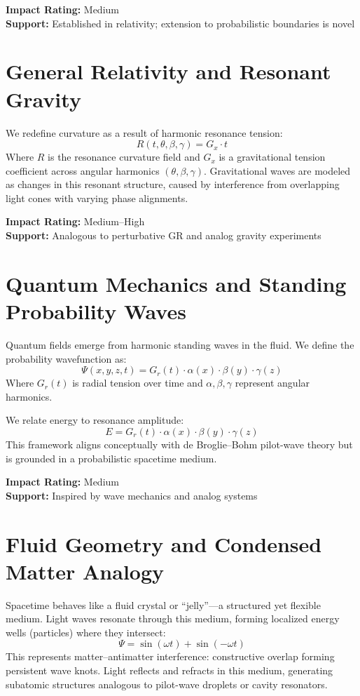 \documentclass[12pt]{article}
\begin{document}
\textbf{Impact Rating:} Medium\\
\textbf{Support:} Established in relativity; extension to probabilistic boundaries is novel

\section{General Relativity and Resonant Gravity}
We redefine curvature as a result of harmonic resonance tension:
\begin{equation}
 R(t,\theta,\beta,\gamma) = G_x \cdot t
\end{equation}
Where $R$ is the resonance curvature field and $G_x$ is a gravitational tension coefficient across angular harmonics $(\theta,\beta,\gamma)$. Gravitational waves are modeled as changes in this resonant structure, caused by interference from overlapping light cones with varying phase alignments.

\textbf{Impact Rating:} Medium--High\\
\textbf{Support:} Analogous to perturbative GR and analog gravity experiments

\section{Quantum Mechanics and Standing Probability Waves}
Quantum fields emerge from harmonic standing waves in the fluid. We define the probability wavefunction as:
\begin{equation}
 \Psi(x, y, z, t) = G_r(t) \cdot \alpha(x) \cdot \beta(y) \cdot \gamma(z)
\end{equation}
Where $G_r(t)$ is radial tension over time and $\alpha, \beta, \gamma$ represent angular harmonics.

We relate energy to resonance amplitude:
\begin{equation}
 E = G_r(t) \cdot \alpha(x) \cdot \beta(y) \cdot \gamma(z)
\end{equation}
This framework aligns conceptually with de Broglie--Bohm pilot-wave theory but is grounded in a probabilistic spacetime medium.

\textbf{Impact Rating:} Medium\\
\textbf{Support:} Inspired by wave mechanics and analog systems

\section{Fluid Geometry and Condensed Matter Analogy}
Spacetime behaves like a fluid crystal or ``jelly''---a structured yet flexible medium. Light waves resonate through this medium, forming localized energy wells (particles) where they intersect:
\begin{equation}
 \Psi = \sin(\omega t) + \sin(-\omega t)
\end{equation}
This represents matter--antimatter interference: constructive overlap forming persistent wave knots. Light reflects and refracts in this medium, generating subatomic structures analogous to pilot-wave droplets or cavity resonators.
\end{document}
